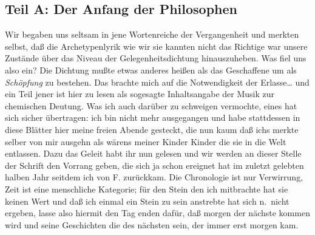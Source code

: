 \documentclass[
]{article}
\author{}
\date{\vspace{-2.5em}}
\begin{document}
\subsection{Teil A: Der Anfang der
Philosophen}\label{teil-a-der-anfang-der-philosophen}

Wir begaben uns seltsam in jene Wortenreiche der Vergangenheit und
merkten selbst, daß die Archetypenlyrik wie wir sie kannten nicht das
Richtige war unsere Zustände über das Niveau der Gelegenheitsdichtung
hinauszuheben. Was fiel uns also ein? Die Dichtung mußte etwas anderes
heißen als das Geschaffene um als \emph{Schöpfung} zu bestehen. Das
brachte mich auf die Notwendigkeit der Erlasse\ldots{} und ein Teil
jener ist hier zu lesen als sogesagte Inhaltsangabe der Musik zur
chemischen Deutung. Was ich auch darüber zu schweigen vermochte, eines
hat sich sicher übertragen: ich bin nicht mehr ausgegangen und habe
stattdessen in diese Blätter hier meine freien Abende gesteckt, die nun
kaum daß ichs merkte selber von mir ausgehn als wärens meiner Kinder
Kinder die sie in die Welt entlassen. Dazu das Geleit habt ihr nun
gelesen und wir werden an dieser Stelle der Schrift den Vorrang geben,
die sich ja schon ereignet hat im zuletzt gelebten halben Jahr seitdem
ich von F. zurückkam. Die Chronologie ist nur Verwirrung, Zeit ist eine
menschliche Kategorie; für den Stein den ich mitbrachte hat sie keinen
Wert und daß ich einmal ein Stein zu sein anstrebte hat sich n.~nicht
ergeben, lasse also hiermit den Tag enden dafür, daß morgen der nächste
kommen wird und seine Geschichten die des nächsten sein, der immer erst
morgen kam.
\end{document}
